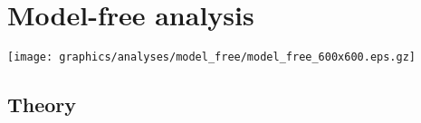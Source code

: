 
\chapter{Model-free analysis}
\label{ch: model-free}


\begin{figure*}[h]
\texttt{[image: graphics/analyses/model\_free/model\_free\_600x600.eps.gz]}
\end{figure*}



\section{Theory}



